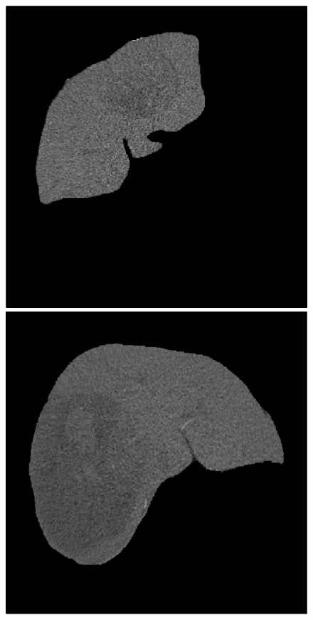 \begin{figure}[!ht]
\centering
\begin{minipage}{4cm}
\includegraphics[width=\linewidth]{../SemanticSeg/images/1_21_orig_resized}
\end{minipage} \hspace{-0.3cm}
\begin{minipage}{4cm}
\includegraphics[width=\linewidth]{../SemanticSeg/images/5_2_orig_resized}

\end{minipage}
\end{figure}
